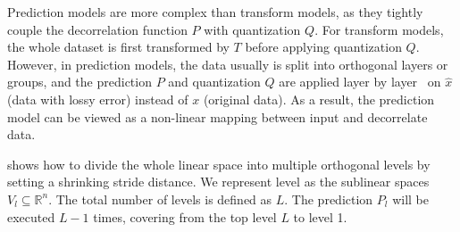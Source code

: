 
Prediction models are more complex than transform models, as they tightly couple the decorrelation function $P$ with quantization $Q$. For transform models, the whole dataset is first transformed by $T$ before applying quantization $Q$. However, in prediction models, the data usually is split into orthogonal layers or groups, and the prediction $P$ and quantization $Q$ are applied layer by layer~\cite{di2024survey, mgard} on $\hat{x}$ (data with lossy error) instead of $x$ (original data). As a result, the prediction model can be viewed as a non-linear mapping between input and decorrelate data.

 shows how to divide the whole linear space into multiple orthogonal levels by setting a shrinking stride distance. We represent level as the sublinear spaces $V_l \subseteq \mathbb{R}^n$. The total number of levels is defined as $L$.
The prediction $
P_l
$ will be executed $L-1$ times, covering from the top level $L$ to level 1.


